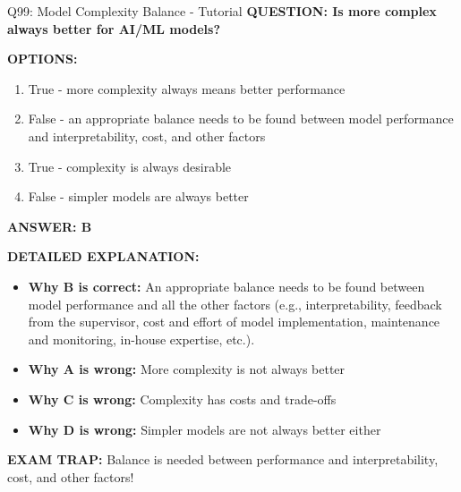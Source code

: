 \documentclass[8pt]{beamer}
\begin{document}
	\begin{frame}{Q99: Model Complexity Balance - Tutorial}
		\fontsize{6.5}{7.5}\selectfont
		\textbf{QUESTION: Is more complex always better for AI/ML models?}
		
		\vspace{0.1cm}
		\textbf{OPTIONS:}
		\begin{enumerate}
			\item True - more complexity always means better performance
			\item False - an appropriate balance needs to be found between model performance and interpretability, cost, and other factors
			\item True - complexity is always desirable
			\item False - simpler models are always better
		\end{enumerate}
		
		\vspace{0.1cm}
		\textcolor{myblue}{\textbf{ANSWER: B}}
		
		\vspace{0.1cm}
		\textbf{DETAILED EXPLANATION:}
		\begin{itemize}
			\item \textbf{Why B is correct:} An appropriate balance needs to be found between model performance and all the other factors (e.g., interpretability, feedback from the supervisor, cost and effort of model implementation, maintenance and monitoring, in-house expertise, etc.).
			\item \textbf{Why A is wrong:} More complexity is not always better
			\item \textbf{Why C is wrong:} Complexity has costs and trade-offs
			\item \textbf{Why D is wrong:} Simpler models are not always better either
		\end{itemize}
		
		\textcolor{myred}{\textbf{EXAM TRAP:}} Balance is needed between \textcolor{myblue}{performance and interpretability, cost, and other factors}!
	\end{frame}
	
\end{document}
